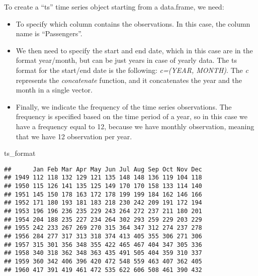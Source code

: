 \documentclass[
]{article}
\newenvironment{Shaded}{\begin{snugshade}}{\end{snugshade}}
\newcommand{\AttributeTok}[1]{\textcolor[rgb]{0.13,0.29,0.53}{#1}}
\newcommand{\DecValTok}[1]{\textcolor[rgb]{0.00,0.00,0.81}{#1}}
\newcommand{\FunctionTok}[1]{\textcolor[rgb]{0.13,0.29,0.53}{\textbf{#1}}}
\newcommand{\NormalTok}[1]{#1}
\newcommand{\OtherTok}[1]{\textcolor[rgb]{0.56,0.35,0.01}{#1}}
\newcommand{\SpecialCharTok}[1]{\textcolor[rgb]{0.81,0.36,0.00}{\textbf{#1}}}
\providecommand{\tightlist}{%
  \setlength{\itemsep}{0pt}\setlength{\parskip}{0pt}}
\begin{document}
To create a ``ts'' time series object starting from a data.frame, we need:

\begin{itemize}
\tightlist
\item
  To specify which column contains the observations. In this case, the column name is ``Passengers''.
\item
  We then need to specify the start and end date, which in this case are in the format year/month, but can be just years in case of yearly data. The ts format for the start/end date is the following: \emph{c=(YEAR, MONTH)}. The \emph{c} represents the \emph{concatenate} function, and it concatenates the year and the month in a single vector.
\item
  Finally, we indicate the frequency of the time series observations. The frequency is specified based on the time period of a year, so in this case we have a frequency equal to 12, because we have monthly observation, meaning that we have 12 observation per year.
\end{itemize}

\begin{Shaded}
\end{Shaded}

\begin{Shaded}
\begin{Highlighting}[]
\NormalTok{ts\_format}
\end{Highlighting}
\end{Shaded}

\begin{verbatim}
##      Jan Feb Mar Apr May Jun Jul Aug Sep Oct Nov Dec
## 1949 112 118 132 129 121 135 148 148 136 119 104 118
## 1950 115 126 141 135 125 149 170 170 158 133 114 140
## 1951 145 150 178 163 172 178 199 199 184 162 146 166
## 1952 171 180 193 181 183 218 230 242 209 191 172 194
## 1953 196 196 236 235 229 243 264 272 237 211 180 201
## 1954 204 188 235 227 234 264 302 293 259 229 203 229
## 1955 242 233 267 269 270 315 364 347 312 274 237 278
## 1956 284 277 317 313 318 374 413 405 355 306 271 306
## 1957 315 301 356 348 355 422 465 467 404 347 305 336
## 1958 340 318 362 348 363 435 491 505 404 359 310 337
## 1959 360 342 406 396 420 472 548 559 463 407 362 405
## 1960 417 391 419 461 472 535 622 606 508 461 390 432
\end{verbatim}
\end{document}
